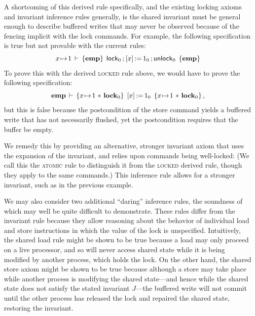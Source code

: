 \documentclass[11pt]{report}
\begin{document}
A shortcoming of this derived rule specifically, and the existing locking axioms and invariant inference rules generally, is the shared invariant must be general enough to describe buffered writes that may never be observed because of the fencing implicit with the lock commands. For example, the following specification is true but not provable with the current rules:     \[ x \!\mapsto\! 1\,\vdash\,\left\lbrace \mathbf{emp} \right\rbrace\;\operatorname{\mathsf{lock}}_0 \operatorname{;} \left[ x \right] \operatorname{:\!=} 1_0 \operatorname{;} \operatorname{\mathsf{unlock}}_0\;\left\lbrace \mathbf{emp} \right\rbrace \] To prove this with the derived \textsc{locked} rule above, we would have to prove the following specification: \[ \mathbf{emp}\,\vdash\,\left\lbrace x \!\mapsto\! 1 \operatorname{\,\ast\,} \mathbf{lock}_{0} \right\rbrace\;\left[ x \right] \operatorname{:\!=} 1_0\;\left\lbrace x \!\mapsto\! 1 \operatorname{\,\ast\,} \mathbf{lock}_{0} \right\rbrace,\] but this is false because the postcondition of the store command yields a buffered write that has not necessarily flushed, yet the postcondition requires that the buffer be empty. 

We remedy this by providing an alternative, stronger invariant axiom that uses the expansion of the invariant, and relies upon commands being well-locked:  (We call this the \textsc{atomic} rule to distinguish it from the \textsc{locked} derived rule, though they apply to the same commands.) This inference rule allows for a stronger invariant, such as in the previous example.
 
We may also consider two additional ``daring'' inference rules, the soundness of which may well be quite difficult to demonstrate. 
These rules differ from the invariant rule because they allow reasoning about the behavior of individual load and store instructions in which the value of the lock is unspecified. Intuitively, the shared load rule might be shown to be true because a load may only proceed on a live processor, and so will never access shared state while it is being modified by another process, which holds the lock. On the other hand, the shared store axiom might be shown to be true because although a store may take place while another process is modifying the shared state---and hence while the shared state does not satisfy the stated invariant $J$---the buffered write will not commit until the other process has released the lock and repaired the shared state, restoring the invariant.
\end{document}
